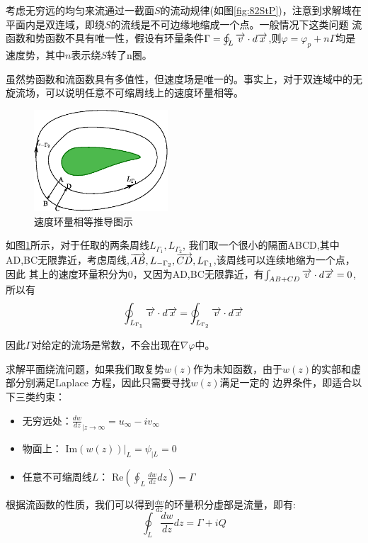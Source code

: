 考虑无穷远的均匀来流通过一截面$S$的流动规律(如图\ref{fig:82StP})，注意到求解域在平面内是双连域，即绕$S$的流线是不可边缘地缩成一个点。一般情况下这类问题
流函数和势函数不具有唯一性，假设有环量条件$\Gamma=\oint_{L} \overrightarrow{v}\cdot d\overrightarrow{x}$,则$\varphi=\varphi_p+n\Gamma$均是速度势，其中$n$表示绕$S$转了n圈。

虽然势函数和流函数具有多值性，但速度场是唯一的。事实上，对于双连域中的无旋流场，可以说明任意不可缩周线上的速度环量相等。

\begin{figure}[!ht]
 \centering
 \includegraphics[width=5cm]{doubleConnectedEqualCircuit.eps}
 \caption{速度环量相等推导图示}\label{fig:82doubleConnectedEqualCircuit}
\end{figure}

如图\ref{fig:82doubleConnectedEqualCircuit}所示，对于任取的两条周线$L_{\Gamma_1},L_{\Gamma_2}$,
我们取一个很小的隔面ABCD,其中AD,BC无限靠近，考虑周线,$\overrightarrow{AB},L_{-\Gamma_2},\overrightarrow{CD},L_{\Gamma_1}$,该周线可以连续地缩为一个点，因此
其上的速度环量积分为0，又因为AD,BC无限靠近，有$\int_{AB+CD}\overrightarrow{v}\cdot d\overrightarrow{x}=0$,所以有
\begin{equation}
\oint_{L_{\Gamma_1}} \overrightarrow{v}\cdot d\overrightarrow{x} = \oint_{L_{\Gamma_2}} \overrightarrow{v}\cdot d\overrightarrow{x}
\end{equation}


因此$\Gamma$对给定的流场是常数，不会出现在$\nabla \varphi$中。

求解平面绕流问题，如果我们取复势$w(z)$作为未知函数，由于$w(z)$的实部和虚部分别满足Laplace 方程，因此只需要寻找$w(z)$满足一定的
边界条件，即适合以下三类约束：
\begin{itemize}
\item 无穷远处：$\frac{dw}{dz}_{|z\to \infty}=u_{\infty}-iv_{\infty}$
\item 物面上： Im$(w(z))|_L=\psi_{|L}=0$
\item 任意不可缩周线$L$： Re$(\oint_{L} \frac{dw}{dz} dz)=\Gamma$
\end{itemize}

根据流函数的性质，我们可以得到$\frac{dw}{dz}$的环量积分虚部是流量，即有:
\begin{equation}\label{eq:82GQ}
\oint_{L} \frac{dw}{dz} dz = \Gamma + i Q
\end{equation}

